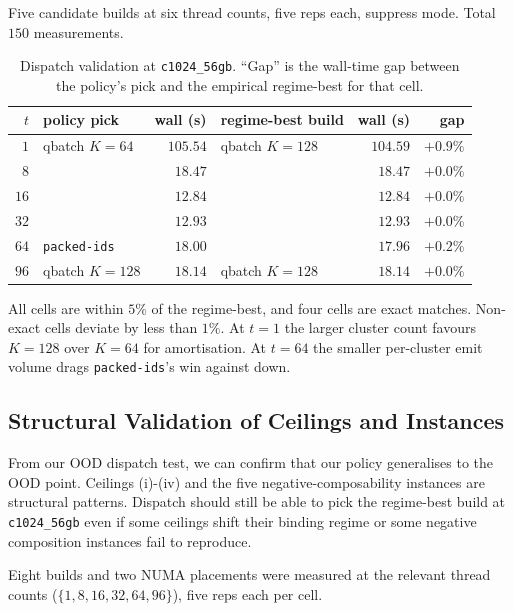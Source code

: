 Five candidate builds at six thread counts, five reps each, suppress mode. Total $150$ measurements.

\begin{table}[H]
  \centering
  \caption[Dispatch validation at the OOD point.]{Dispatch validation at \texttt{c1024\_56gb}. ``Gap'' is the wall-time gap between the policy's pick and the empirical regime-best for that cell.}
  \label{tab:ood_dispatch}
  \begin{tabular}{rlrlrr}
    \toprule
    $t$ & policy pick & wall (s) & regime-best build & wall (s) & gap \\
    \midrule
    $1$ & qbatch $K{=}64$ & $105.54$ & qbatch $K{=}128$ & $104.59$ & $+0.9\%$ \\
    $8$ & \bcombo{} &$18.47$ & \bcombo{} &$18.47$ & $+0.0\%$ \\
    $16$ & \bcombo{} &$12.84$ & \bcombo{} &$12.84$ & $+0.0\%$ \\
    $32$ & \bcombo{} &$12.93$ & \bcombo{} &$12.93$ & $+0.0\%$ \\
    $64$ & \texttt{packed-ids} & $18.00$ & \bcombo{} &$17.96$ & $+0.2\%$ \\
    $96$ & qbatch $K{=}128$ & $18.14$ & qbatch $K{=}128$ & $18.14$ & $+0.0\%$ \\
    \bottomrule
  \end{tabular}
\end{table}

All cells are within $5\%$ of the regime-best, and four cells are exact matches. Non-exact cells deviate by less than $1\%$. 
At $t=1$ the larger cluster count favours $K=128$ over $K=64$ for amortisation. At $t=64$ the smaller per-cluster emit volume drags \texttt{packed-ids}'s win against \bcombo{} down. 

\subsection{Structural Validation of Ceilings and Instances\label{sec:exp:ood:struct}}

From our OOD dispatch test, we can confirm that our policy generalises to the OOD point. Ceilings (i)-(iv) and the five negative-composability instances are structural patterns. Dispatch should still be able to pick the regime-best build at \texttt{c1024\_56gb} even if some ceilings shift their binding regime or some negative composition instances fail to reproduce.

Eight builds and two NUMA placements were measured at the relevant thread counts ($\{1, 8, 16, 32, 64, 96\}$), five reps each per cell. 

